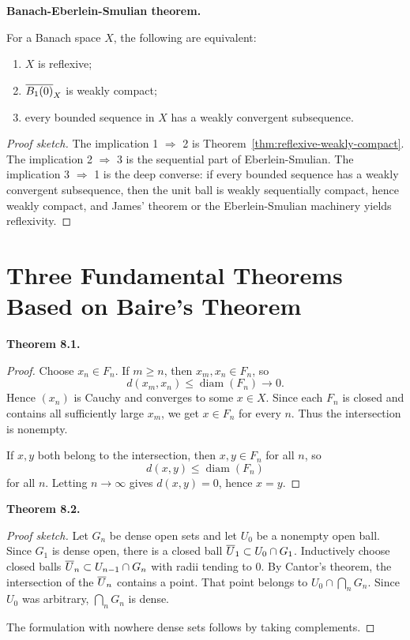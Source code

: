 \documentclass[11pt]{article}
\newenvironment{theoremstmt}[1]{%
  \par\medskip\noindent\textbf{Theorem #1. }\itshape
}{\par\medskip}
\newenvironment{namedstmt}[1]{%
  \par\medskip\noindent\textbf{#1. }\itshape
}{\par\medskip}
\begin{document}
\begin{namedstmt}{Banach-Eberlein-Smulian theorem}
For a Banach space $X$, the following are equivalent:
\begin{enumerate}
\item $X$ is reflexive;
\item $\overline{B_1(0)}_X$ is weakly compact;
\item every bounded sequence in $X$ has a weakly convergent subsequence.
\end{enumerate}
\end{namedstmt}

\begin{proof}[Proof sketch]
The implication 1 $\Rightarrow$ 2 is Theorem~\ref{thm:reflexive-weakly-compact}. The implication 2 $\Rightarrow$ 3 is the sequential part of Eberlein-Smulian. The implication 3 $\Rightarrow$ 1 is the deep converse: if every bounded sequence has a weakly convergent subsequence, then the unit ball is weakly sequentially compact, hence weakly compact, and James' theorem or the Eberlein-Smulian machinery yields reflexivity.
\end{proof}

\section{Three Fundamental Theorems Based on Baire's Theorem}

\begin{theoremstmt}{8.1}
\thmCantorIntersection
\end{theoremstmt}

\begin{proof}
Choose $x_n\in F_n$. If $m\ge n$, then $x_m,x_n\in F_n$, so
\[
d(x_m,x_n)\le \operatorname{diam}(F_n)\to 0.
\]
Hence $(x_n)$ is Cauchy and converges to some $x\in X$. Since each $F_n$ is closed and contains all sufficiently large $x_m$, we get $x\in F_n$ for every $n$. Thus the intersection is nonempty.

If $x,y$ both belong to the intersection, then $x,y\in F_n$ for all $n$, so
\[
d(x,y)\le \operatorname{diam}(F_n)
\]
for all $n$. Letting $n\to\infty$ gives $d(x,y)=0$, hence $x=y$.
\end{proof}

\begin{theoremstmt}{8.2}
\thmBaireCategory
\end{theoremstmt}

\begin{proof}[Proof sketch]
Let $G_n$ be dense open sets and let $U_0$ be a nonempty open ball. Since $G_1$ is dense open, there is a closed ball $\overline{U}_1\subset U_0\cap G_1$. Inductively choose closed balls $\overline{U}_n\subset U_{n-1}\cap G_n$ with radii tending to $0$. By Cantor's theorem, the intersection of the $\overline{U}_n$ contains a point. That point belongs to $U_0\cap \bigcap_n G_n$. Since $U_0$ was arbitrary, $\bigcap_n G_n$ is dense.

The formulation with nowhere dense sets follows by taking complements.
\end{proof}
\end{document}
